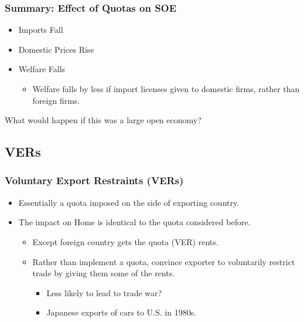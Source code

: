 \documentclass{beamer}
\begin{document}
\begin{frame}
	\frametitle{Summary: Effect of Quotas on SOE}

\begin{itemize}
	\item Imports Fall
	\item Domestic Prices Rise
	\item Welfare Falls
		\begin{itemize}
			\item Welfare falls by less if import licenses given to domestic firms, rather than foreign firms.
		\end{itemize}
\end{itemize}

\begin{center}
What would happen if this was a large open economy? 
\end{center}
	
\end{frame}

\subsection{VERs}

\begin{frame}
	\frametitle{Voluntary Export Restraints (VERs)}
	\begin{itemize}
		\item Essentially a quota imposed on the side of exporting country.
		\item The impact on Home is identical to the quota considered before.
			\begin{itemize}
				\item Except foreign country gets the quota (VER) rents.
				\item Rather than implement a quota, convince exporter to voluntarily restrict trade by giving them some of the rents.
					\begin{itemize}
						\item Less likely to lead to trade war?
						\item Japanese exports of cars to U.S. in 1980s.
					\end{itemize}
			\end{itemize}
	\end{itemize}
	

\end{frame}
\end{document}
